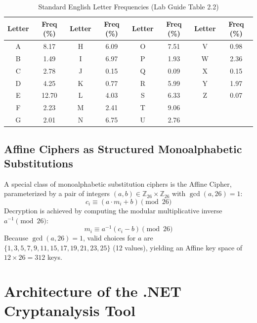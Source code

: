 \documentclass[12pt,a4paper]{article}
\begin{document}
\begin{table}[h!]
\centering
\caption{Standard English Letter Frequencies (Lab Guide Table 2.2)}
\label{tab:std_frequencies}
\small
\begin{tabular}{|c|c||c|c||c|c||c|c|}
\hline
\textbf{Letter} & \textbf{Freq (\%)} & \textbf{Letter} & \textbf{Freq (\%)} & \textbf{Letter} & \textbf{Freq (\%)} & \textbf{Letter} & \textbf{Freq (\%)} \\
\hline
A & 8.17 & H & 6.09 & O & 7.51 & V & 0.98 \\
B & 1.49 & I & 6.97 & P & 1.93 & W & 2.36 \\
C & 2.78 & J & 0.15 & Q & 0.09 & X & 0.15 \\
D & 4.25 & K & 0.77 & R & 5.99 & Y & 1.97 \\
E & 12.70 & L & 4.03 & S & 6.33 & Z & 0.07 \\
F & 2.23 & M & 2.41 & T & 9.06 & \multicolumn{2}{c|}{} \\
G & 2.01 & N & 6.75 & U & 2.76 & \multicolumn{2}{c|}{} \\
\hline
\end{tabular}
\end{table}

\subsection{Affine Ciphers as Structured Monoalphabetic Substitutions}
A special class of monoalphabetic substitution ciphers is the Affine Cipher, parameterized by a pair of integers $(a, b) \in \mathbb{Z}_{26} \times \mathbb{Z}_{26}$ with $\gcd(a, 26) = 1$:
\begin{equation}
    c_i \equiv (a \cdot m_i + b) \pmod{26}
\end{equation}
Decryption is achieved by computing the modular multiplicative inverse $a^{-1} \pmod{26}$:
\begin{equation}
    m_i \equiv a^{-1}(c_i - b) \pmod{26}
\end{equation}
Because $\gcd(a, 26) = 1$, valid choices for $a$ are $\{1, 3, 5, 7, 9, 11, 15, 17, 19, 21, 23, 25\}$ (12 values), yielding an Affine key space of $12 \times 26 = 312$ keys.

\section{Architecture of the .NET Cryptanalysis Tool}
\end{document}
